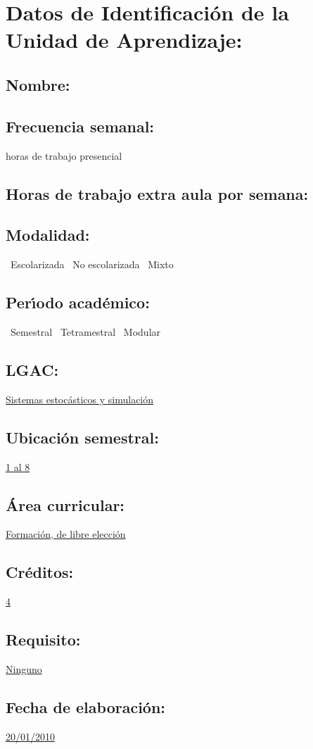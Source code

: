 \documentclass[10 pt]{article}
\begin{document}


\section{Datos de Identificaci\'{o}n de la Unidad de Aprendizaje:}
\subsection{Nombre:} 
\subsection{Frecuencia semanal:} horas de trabajo presencial 
\subsection{Horas de trabajo extra aula por semana:} 
\subsection{Modalidad:} \yes~Escolarizada \no~No escolarizada \no~Mixto
\subsection{Per\'{\i}odo acad\'{e}mico:} \yes~Semestral
\no~Tetramestral \no~Modular
\subsection{LGAC:} \underline{Sistemas estoc\'{a}sticos y simulaci\'{o}n}
\subsection{Ubicaci\'{o}n semestral:} \underline{1 al 8}
\subsection{\'{A}rea curricular:} \underline{Formaci\'{o}n, de libre elecci\'{o}n}
\subsection{Cr\'{e}ditos:} \underline{4}
\subsection{Requisito:} \underline{Ninguno}
\subsection{Fecha de elaboraci\'{o}n:} \underline{20/01/2010}
\end{document}
